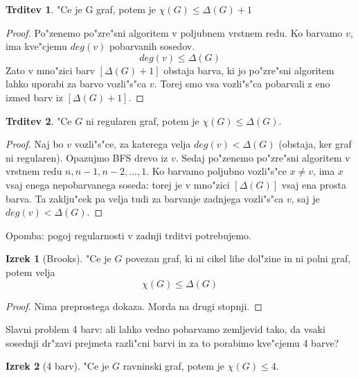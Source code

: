 \documentclass{article}
\theoremstyle{definition}
\newtheorem{claim}{Trditev}[section]
\newtheorem{theorem}{Izrek}[section]
\begin{document}
	\begin{claim}
		"Ce je G graf, potem je $\chi(G) \leq \Delta(G) + 1$
		\begin{proof}
			Po"zenemo po"zre"sni algoritem v poljubnem vrstnem redu. Ko barvamo $v$, ima kve"cjemu $deg(v)$ pobarvanih sosedov. $$deg(v) \leq \Delta(G)$$
			Zato v mno"zici barv $[\Delta(G)+1]$ obstaja barva, ki jo po"zre"sni algoritem lahko uporabi za barvo vozli"s"ca $v$. Torej smo vsa vozli"s"ca pobarvali z eno izmed barv iz $[\Delta(G)+1]$.
		\end{proof}
	\end{claim}

	\begin{claim}
		"Ce $G$ ni regularen graf, potem je $\chi(G) \leq \Delta(G)$.
		\begin{proof}
			Naj bo $v$ vozli"s"ce, za katerega velja $deg(v) < \Delta(G)$ (obstaja, ker graf ni regularen). Opazujmo BFS drevo iz $v$. Sedaj po"zenemo po"zre"sni algoritem v vrstnem redu $n, n-1, n-2, ..., 1$. Ko barvamo poljubno vozli"s"ce $x \neq v$, ima $x$ vsaj enega nepobarvanega soseda: torej je v mno"zici $[\Delta(G)]$ vsaj ena prosta barva. Ta zaklju"cek pa velja tudi za barvanje zadnjega vozli"s"ca $v$, saj je $deg(v) < \Delta(G)$.
		\end{proof}
	\end{claim}
	Opomba: pogoj regularnosti v zadnji trditvi potrebujemo.
	
	\begin{theorem}[Brooks]
		"Ce je $G$ povezan graf, ki ni cikel lihe dol"zine in ni polni graf, potem velja 
		$$\chi(G) \leq \Delta(G)$$
		\begin{proof}
			Nima preprostega dokaza. Morda na drugi stopnji.
		\end{proof}
	\end{theorem}
	
	Slavni problem 4 barv: ali lahko vedno pobarvamo zemljevid tako, da vsaki sosednji dr"zavi prejmeta razli"cni barvi in za to porabimo kve"cjemu 4 barve?
	
	
	\begin{theorem}[4 barv]
		"Ce je $G$ ravninski graf, potem je $\chi(G) \leq 4$.
	\end{theorem}
	
\end{document}
